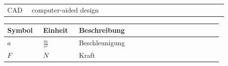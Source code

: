 

\begin{tabular}{p{0.1\linewidth} p{0.7\linewidth} p{0.1\linewidth}}
	CAD & computer-aided design
\end{tabular}
	
	
%
\begin{center}
	\begin{tabular}{p{0.15\linewidth} p{0.15\linewidth} p{0.6\linewidth}}
		\hline
		Symbol & Einheit & Beschreibung\\\hline
		$a$ & $\unit{\frac{m}{s^2}}$ & Beschleunigung\\
		$F$ & $\unit{N}$ & Kraft\\\hline
	\end{tabular}
\end{center}
